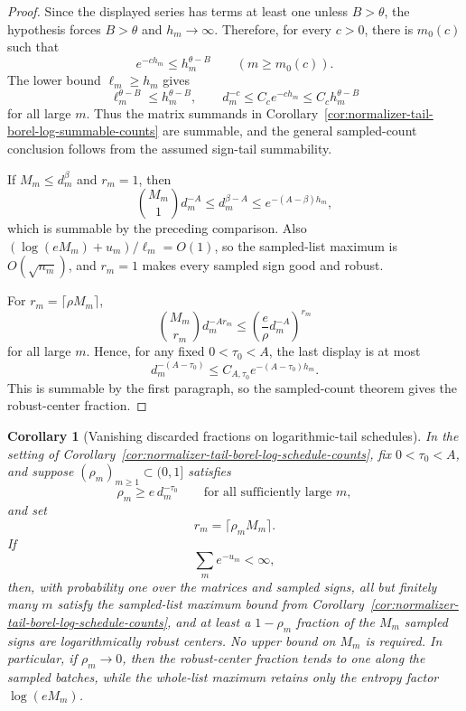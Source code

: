 \documentclass[11pt]{amsart}
\numberwithin{equation}{section}
\newtheorem{corollary}[theorem]{Corollary}
\theoremstyle{definition}
\theoremstyle{remark}
\begin{document}
\begin{proof}
Since the displayed series has terms at least one unless \(B>\theta\), the
hypothesis forces \(B>\theta\) and \(h_m\to\infty\).  Therefore, for every
\(c>0\), there is \(m_0(c)\) such that
\[
  e^{-c h_m}\le h_m^{\theta-B}\qquad(m\ge m_0(c)).
\]
The lower bound \(\ell_m\ge h_m\) gives
\[
  \ell_m^{\theta-B}\le h_m^{\theta-B},
  \qquad
  d_m^{-c}\le C_c e^{-c h_m}\le C_c h_m^{\theta-B}
\]
for all large \(m\).  Thus the matrix summands in
Corollary~\ref{cor:normalizer-tail-borel-log-summable-counts} are summable, and
the general sampled-count conclusion follows from the assumed sign-tail
summability.

If \(M_m\le d_m^\beta\) and \(r_m=1\), then
\[
  \binom{M_m}{1}d_m^{-A}\le d_m^{\beta-A}
  \le e^{-(A-\beta)h_m},
\]
which is summable by the preceding comparison.  Also
\((\log(eM_m)+u_m)/\ell_m=O(1)\), so the sampled-list maximum is
\(O(\sqrt{n_m})\), and \(r_m=1\) makes every sampled sign good and robust.

For \(r_m=\lceil\rho M_m\rceil\),
\[
  \binom{M_m}{r_m}d_m^{-A r_m}
  \le
  \left(\frac{e}{\rho}d_m^{-A}\right)^{r_m}
\]
for all large \(m\).  Hence, for any fixed \(0<\tau_0<A\), the last display is at
most
\[
  d_m^{-(A-\tau_0)}
  \le C_{A,\tau_0}e^{-(A-\tau_0)h_m}.
\]
This is summable by the first paragraph, so the
sampled-count theorem gives the robust-center fraction.
\end{proof}

\begin{corollary}[Vanishing discarded fractions on logarithmic-tail schedules]
\label{cor:normalizer-tail-borel-log-vanishing-fractions}
In the setting of
Corollary~\ref{cor:normalizer-tail-borel-log-schedule-counts}, fix
\(0<\tau_0<A\), and suppose
\((\rho_m)_{m\ge1}\subset(0,1]\) satisfies
\[
  \rho_m\ge e\,d_m^{-\tau_0}
  \qquad\text{for all sufficiently large }m,
\]
and set
\[
  r_m=\lceil\rho_mM_m\rceil .
\]
If
\[
  \sum_m e^{-u_m}<\infty ,
\]
then, with probability one over the matrices and sampled signs, all but finitely
many \(m\) satisfy the sampled-list maximum bound from
Corollary~\ref{cor:normalizer-tail-borel-log-schedule-counts}, and at least a
\(1-\rho_m\) fraction of the \(M_m\) sampled signs are logarithmically robust
centers.  No upper bound on \(M_m\) is required.  In particular, if
\(\rho_m\to0\), then the robust-center fraction tends to one along the sampled
batches, while the whole-list maximum retains only the entropy factor
\(\log(eM_m)\).
\end{corollary}
\end{document}
